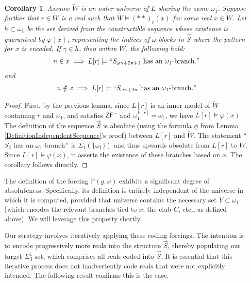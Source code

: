\documentclass[a4paper,11pt]{article}
\newtheorem{corollary}[theorem]{Corollary}
\newcommand{\forceP}{\mathbb{P}}
\newcommand{\ZFP}{\mathsf{ZF}^-}
\begin{document}
\begin{corollary}\label{codesdeterminerealworld}
Assume $\tilde{W}$ is an outer universe of $L$ sharing the same $\omega_1$. Suppose further that $r \in \tilde{W}$ is a real such that $\tilde{W} \models (\ast \ast)_r(x)$ for some real $x \in \tilde{W}$. Let $h \subset \omega_1$ be the set derived from the constructible sequence whose existence is guaranteed by $\varphi(x)$, representing the indices of $\omega$-blocks in $\vec{S}$ where the pattern for $x$ is encoded. If $\gamma \in h$, then within $\tilde{W}$, the following hold:
\begin{align*}
n \in x \implies L[r] \models ``S_{\omega \gamma + 2n+1} \text{ has an } \omega_1\text{-branch}."
\end{align*}
and
\begin{align*}
n \notin x \implies L[r] \models ``S_{\omega \gamma + 2n} \text{ has an } \omega_1\text{-branch}."
\end{align*}
\end{corollary}
\begin{proof}
First, by the previous lemma, since $L[r]$ is an inner model of $\tilde{W}$ containing $r$ and $\omega_1$, and satisfies $\ZFP$ and $\omega_1^{L[r]} = \omega_1$, we have $L[r] \models \varphi(x)$. The definition of the sequence $\vec{S}$ is absolute (using the formula $\phi$ from Lemma \ref{DefinitionIndependentSequence}'s proof) between $L[r]$ and $\tilde{W}$. The statement ``$S_{\beta}$ has an $\omega_1$-branch$"$ is $\Sigma_1(\{\omega_1\})$ and thus upwards absolute from $L[r]$ to $\tilde{W}$. Since $L[r] \models \varphi(x)$, it asserts the existence of these branches based on $x$. The corollary follows directly.
\end{proof}

The definition of the forcing $\forceP(g,x)$ exhibits a significant degree of absoluteness. Specifically, its definition is entirely independent of the universe in which it is computed, provided that universe contains the necessary set $Y \subset \omega_1$ (which encodes the relevant branches tied to $x$, the club $C$, etc., as defined above). We will leverage this property shortly.

Our strategy involves iteratively applying these coding forcings. The intention is to encode progressively more reals into the structure $\vec{S}$, thereby populating our target $\Sigma^1_3$-set, which comprises all reals coded into $\vec{S}$. It is essential that this iterative process does not inadvertently code reals that were not explicitly intended. The following result confirms this is the case.
\end{document}
